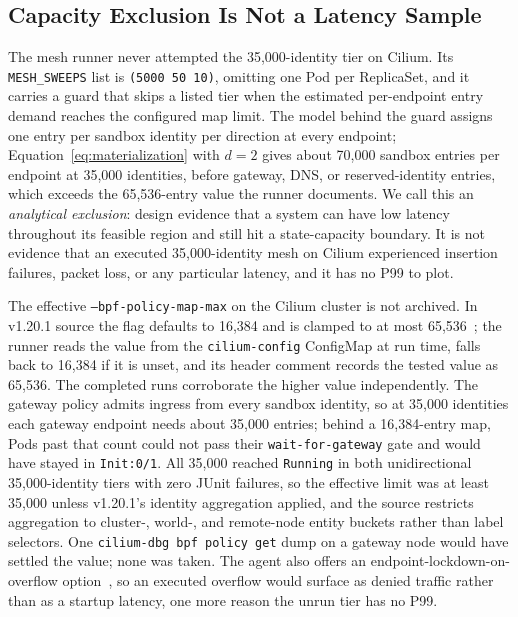 \subsection{Capacity Exclusion Is Not a Latency Sample}
\label{sec:eval-capacity}
The mesh runner never attempted the 35,000-identity tier on Cilium. Its
\texttt{MESH\_SWEEPS} list is \texttt{(5000 50 10)}, omitting one Pod per
ReplicaSet, and it carries a guard that skips a listed tier when the
estimated per-endpoint entry demand reaches the configured map limit.
The model behind the guard assigns one entry per sandbox identity per
direction at every endpoint; Equation~\ref{eq:materialization} with
$d=2$ gives about 70,000 sandbox entries per endpoint at 35,000
identities, before gateway, DNS, or reserved-identity entries, which
exceeds the 65,536-entry value the runner documents. We call this an
\emph{analytical exclusion}: design evidence that a system can have low
latency throughout its feasible region and still hit a state-capacity
boundary. It is not evidence that an executed 35,000-identity mesh on
Cilium experienced insertion failures, packet loss, or any particular
latency, and it has no P99 to plot.

The effective \texttt{--bpf-policy-map-max} on the Cilium cluster is not
archived. In v1.20.1 source the flag defaults to 16,384 and is clamped to
at most 65,536~\cite{ciliumagentref}; the runner reads the value from the
\texttt{cilium-config} ConfigMap at run time, falls back to 16,384 if it
is unset, and its header comment records the tested value as 65,536. The
completed runs corroborate the higher value independently. The gateway
policy admits ingress from every sandbox identity, so at 35,000
identities each gateway endpoint needs about 35,000 entries; behind a
16,384-entry map, Pods past that count could not pass their
\texttt{wait-for-gateway} gate and would have stayed in
\texttt{Init:0/1}. All 35,000 reached \texttt{Running} in both
unidirectional 35,000-identity tiers with zero JUnit failures, so the
effective limit was at least 35,000 unless v1.20.1's identity aggregation
applied, and the source restricts aggregation to cluster-, world-, and
remote-node entity buckets rather than label selectors. One
\texttt{cilium-dbg bpf policy get} dump on a gateway node would have
settled the value; none was taken. The agent also offers an
endpoint-lockdown-on-overflow option~\cite{ciliumagentref}, so an
executed overflow would surface as denied traffic rather than as a
startup latency, one more reason the unrun tier has no P99.

